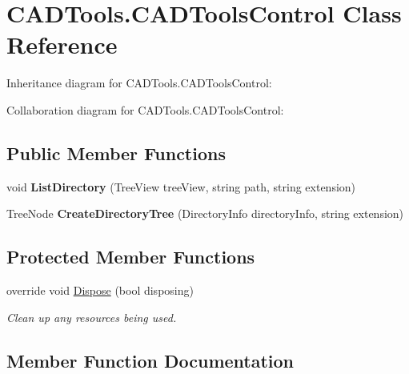 \hypertarget{class_c_a_d_tools_1_1_c_a_d_tools_control}{}\section{C\+A\+D\+Tools.\+C\+A\+D\+Tools\+Control Class Reference}
\label{class_c_a_d_tools_1_1_c_a_d_tools_control}


Inheritance diagram for C\+A\+D\+Tools.\+C\+A\+D\+Tools\+Control\+:


Collaboration diagram for C\+A\+D\+Tools.\+C\+A\+D\+Tools\+Control\+:
\subsection*{Public Member Functions}
\begin{DoxyCompactItemize}
\item 
\mbox{\label{class_c_a_d_tools_1_1_c_a_d_tools_control_a2dc9f74b41f14a96394889f6150f337e}} 
void {\bfseries List\+Directory} (Tree\+View tree\+View, string path, string extension)
\item 
\mbox{\label{class_c_a_d_tools_1_1_c_a_d_tools_control_ac06fd008000db9f9b62f4b6c84d3005c}} 
Tree\+Node {\bfseries Create\+Directory\+Tree} (Directory\+Info directory\+Info, string extension)
\end{DoxyCompactItemize}
\subsection*{Protected Member Functions}
\begin{DoxyCompactItemize}
\item 
override void \mbox{\hyperlink{class_c_a_d_tools_1_1_c_a_d_tools_control_a7416909fa312a952d0b584a74b4d978a}{Dispose}} (bool disposing)
\begin{DoxyCompactList}\small\item\em Clean up any resources being used. \end{DoxyCompactList}\end{DoxyCompactItemize}


\subsection{Member Function Documentation}
\mbox{\label{class_c_a_d_tools_1_1_c_a_d_tools_control_a7416909fa312a952d0b584a74b4d978a}} 
